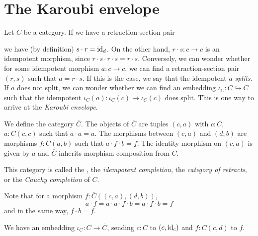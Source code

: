 \section{The Karoubi envelope}
Let $ C $ be a category. If we have a retraction-section pair
we have (by definition) $ s \cdot r = \text{id}_{d} $. On the other hand, $ r \cdot s: c \to c $ is an idempotent morphism, since $ r \cdot s \cdot r \cdot s = r \cdot s $. Conversely, we can wonder whether for some idempotent morphism $ a: c \to c $, we can find a retraction-section pair $ (r, s) $ such that $ a = r \cdot s $. If this is the case, we say that the idempotent $ a $ \textit{splits}. If $ a $ does not split, we can wonder whether we can find an embedding $ \iota_C : C \hookrightarrow \overline C $ such that the idempotent $ \iota_C(a): \iota_C(c) \to \iota_C(c) $ does split. This is one way to arrive at the \textit{Karoubi envelope}.

\begin{definition}
  We define the category $ \overline C $. The objects of $ \overline C $ are tuples $ (c, a) $ with $ c: C $, $ a: C(c, c) $ such that $ a \cdot a = a $. The morphisms between $ (c, a) $ and $ (d, b) $ are morphisms $ f: C(a, b) $ such that $ a \cdot f \cdot b = f $. The identity morphism on $ (c, a) $ is given by $ a $ and $ \overline C $ inherits morphism composition from $ C $.
\end{definition}
This category is called the , the \textit{idempotent completion}, the \textit{category of retracts}, or the \textit{Cauchy completion} of $ C $.

\begin{remark}
  Note that for a morphism $ f: \overline C((c, a), (d, b)) $,
  \[ a \cdot f = a \cdot a \cdot f \cdot b = a \cdot f \cdot b = f \]
  and in the same way, $ f \cdot b = f $.
\end{remark}

\begin{definition}
  We have an embedding $ \iota_C: C \to \overline C $, sending $ c: C $ to $ (c, \text{id}_{c}) $ and $ f: C(c, d) $ to $ f $.
\end{definition}

